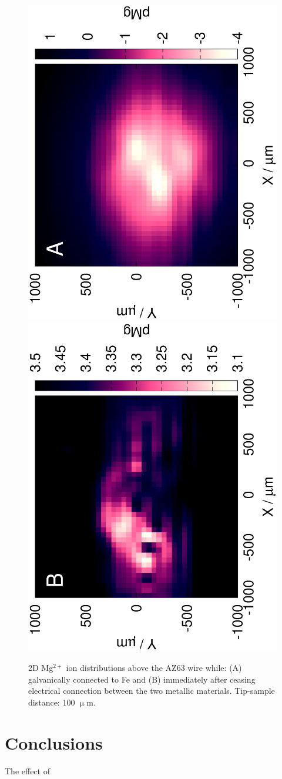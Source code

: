 \documentclass[3p]{elsarticle}
\begin{document}
\begin{figure}
\centering
\includegraphics[trim = 10mm 20mm 0mm 10mm, clip, width=\s\textwidth, angle=-90]{17012501.eps}\includegraphics[trim = 10mm 20mm 0mm 10mm, clip, width=\s\textwidth, angle=-90]{17012503_deconvoluted.eps}
\caption{2D Mg$^{2+}$ ion distributions above the AZ63 wire while: (A) galvanically connected to Fe and (B) immediately after ceasing electrical connection between the two metallic materials. Tip-sample distance: 100 $\upmu$m.}
\label{fig:2d}
\end{figure}





\section{Conclusions}

The effect of 
\end{document}
